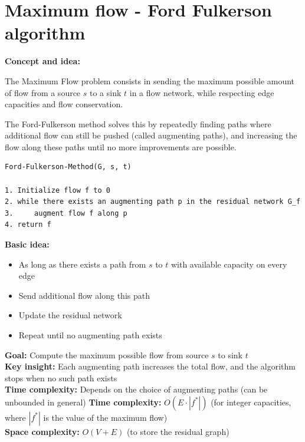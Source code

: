 \documentclass[11pt,a4paper,openany]{book}
\begin{document}
\vspace{2cm}





\section{Maximum flow - Ford Fulkerson algorithm}



\textbf{Concept and idea:}

The Maximum Flow problem consists in sending the maximum possible amount of flow from a source $s$ to a sink $t$ in a flow network, while respecting edge capacities and flow conservation.

The Ford-Fulkerson method solves this by repeatedly finding paths where additional flow can still be pushed (called augmenting paths), and increasing the flow along these paths until no more improvements are possible.

\begin{lstlisting}
Ford-Fulkerson-Method(G, s, t)

1. Initialize flow f to 0
2. while there exists an augmenting path p in the residual network G_f
3.     augment flow f along p
4. return f
\end{lstlisting}

\textbf{Basic idea:}
\begin{itemize}
    \item As long as there exists a path from $s$ to $t$ with available capacity on every edge
    \item Send additional flow along this path
    \item Update the residual network
    \item Repeat until no augmenting path exists
\end{itemize}

\textbf{Goal:} Compute the maximum possible flow from source $s$ to sink $t$ \\

\textbf{Key insight:} Each augmenting path increases the total flow, and the algorithm stops when no such path exists \\

\textbf{Time complexity:} Depends on the choice of augmenting paths (can be unbounded in general)
\textbf{Time complexity:} $O(E \cdot |f^*|)$ (for integer capacities, where $|f^*|$ is the value of the maximum flow) \\
\textbf{Space complexity:} $O(V + E)$ (to store the residual graph)
\end{document}
